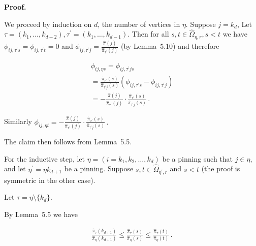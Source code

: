 


\par\medskip\noindent\textbf{Proof.}\par



We proceed by induction on $d$, the number of vertices in $\eta$. Suppose $j=k_{d}$, Let $\tau=(k_{1},\dots,k_{d-2}),\tau^{\prime}=(k_{1},\dots,k_{d-1}).$ Then for all $s,t\in\hat{\Omega}_{\eta,r},s<t$ we have $\phi_{ij,\tau^{\prime}s}=\phi_{ij,\tau^{\prime}t}=0$ and $\phi_{ij,\tau^{\prime}j}=\frac{\hat{\pi}(j)}{\hat{\pi}_{\tau^{\prime}}(j)}$ (by Lemma 5.10) and therefore\par


\[\begin{gathered}
\displaystyle\phi_{ij,\eta s} \displaystyle=\phi_{ij,\tau^{\prime}js} \\
\displaystyle=\frac{\hat{\pi}_{\tau^{\prime}}(s)}{\hat{\pi}_{\tau^{\prime}j}(s)}(\phi_{ij,\tau^{\prime}s}-\phi_{ij,\tau^{\prime}j}) \\
\displaystyle=-\frac{\hat{\pi}(j)}{\hat{\pi}_{\tau^{\prime}}(j)}\cdot\frac{\hat{\pi}_{\tau^{\prime}}(s)}{\hat{\pi}_{\tau^{\prime}j}(s)}\,.
\end{gathered}\]




Similarly $\phi_{ij,\eta t}=-\frac{\hat{\pi}(j)}{\hat{\pi}_{\tau^{\prime}}(j)}\cdot\frac{\hat{\pi}_{\tau^{\prime}}(s)}{\hat{\pi}_{\tau^{\prime}j}(s)}\,.$\par




The claim then follows from Lemma 5.5.\par




For the inductive step, let $\eta=(i=k_{1},k_{2},\dots,k_{d})$ be a pinning such that $j\in\eta$, and let $\eta^{\prime}=\eta k_{d+1}$ be a pinning. Suppose $s,t\in\hat{\Omega}_{\eta^{\prime},r}$ and $s<t$ (the proof is symmetric in the other case).\par




Let $\tau=\eta\setminus\{k_{d}\}$.\par




By Lemma 5.5 we have\par


\[\begin{gathered}
\frac{\hat{\pi}_{\tau}(k_{d+1})}{\hat{\pi}_{\eta}(k_{d+1})}\leq\frac{\hat{\pi}_{\tau}(s)}{\hat{\pi}_{\eta}(s)}\leq\frac{\hat{\pi}_{\tau}(t)}{\hat{\pi}_{\eta}(t)}\,.
\end{gathered}\]


